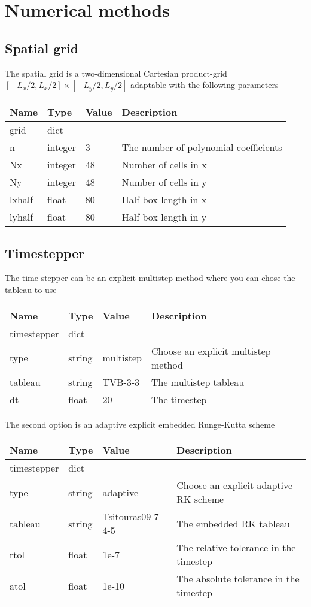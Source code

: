 \section{Numerical methods}

\subsection{Spatial grid}
The spatial grid is a two-dimensional Cartesian product-grid $[-L_x/2, L_x/2]\times [-L_y/2, L_y/2]$ adaptable with the following parameters
\begin{longtable}{llll}
\toprule
\rowcolor{gray!50}\textbf{Name} &  \textbf{Type} & \textbf{Value}  & \textbf{Description}  \\ \midrule
grid & dict & & \\
\qquad n  & integer & 3  & The number of polynomial coefficients \\
\qquad Nx & integer & 48 & Number of cells in x \\
\qquad Ny & integer & 48 & Number of cells in y \\
\qquad lxhalf & float& 80 & Half box length in x \\
\qquad lyhalf & float& 80 & Half box length in y \\
\bottomrule
\end{longtable}
\subsection{Timestepper}
The time stepper can be an explicit multistep method where you can chose the
tableau to use
\begin{longtable}{llll}
\toprule
\rowcolor{gray!50}\textbf{Name} &  \textbf{Type} & \textbf{Value}  & \textbf{Description}  \\ \midrule
timestepper & dict & & \\
\qquad type     & string & multistep & Choose an explicit multistep method \\
\qquad tableau  & string & TVB-3-3  & The multistep tableau \\
\qquad dt & float & 20 & The timestep \\
\bottomrule
\end{longtable}
The second option is an adaptive explicit embedded Runge-Kutta scheme
\begin{longtable}{llll}
\toprule
\rowcolor{gray!50}\textbf{Name} &  \textbf{Type} & \textbf{Value}  & \textbf{Description}  \\ \midrule
timestepper & dict & & \\
\qquad type     & string & adaptive & Choose an explicit adaptive RK scheme \\
\qquad tableau  & string & Tsitouras09-7-4-5  & The embedded RK tableau \\
\qquad rtol & float & 1e-7 & The relative tolerance in the timestep \\
\qquad atol & float & 1e-10 & The absolute tolerance in the timestep \\
\bottomrule
\end{longtable}
